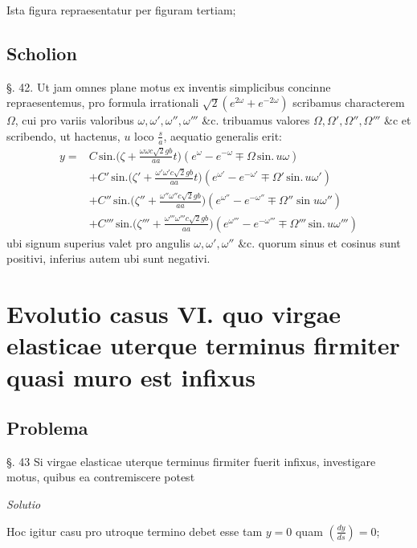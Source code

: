 \documentclass[11pt,a4paper]{article}
\begin{document}
Ista figura repraesentatur per figuram tertiam;

\subsection{Scholion}

§. 42. Ut jam omnes plane motus ex inventis simplicibus
concinne repraesentemus, pro formula irrationali $\surd 2(e^{2\omega}+e^{-2\omega})$
scribamus characterem $\Omega$, cui pro variis valoribus $\omega, \omega', \omega'', \omega'''$ \&c.
 tribuamus valores $\Omega, \Omega', \Omega'', \Omega'''$ \&c et scribendo, ut hactenus,
$u$ loco $\frac{s}{a}$, aequatio generalis erit:
\begin{align*}
y ={}& C\,\text{sin.}\Big(\zeta+\frac{\omega\omega c\surd 2gb}{aa}t\Big)(e^{\omega}-e^{-\omega}\mp\Omega\,\text{sin.}\,u\omega) \\
&+ C'\,\text{sin.}\Big(\zeta'+\frac{\omega'\omega'c\surd 2gb}{aa}t\Big)(e^{\omega'}-e^{-\omega'}\mp\Omega'\,\text{sin.}\,u\omega') \\
&+ C''\,\text{sin.}\Big(\zeta''+\frac{\omega''\omega''c\surd 2gb}{aa}\Big)(e^{\omega''}-e^{-\omega''}\mp\Omega''\sin u\omega'') \\
&+ C'''\,\text{sin.}\Big(\zeta'''+\frac{\omega'''\omega'''c\surd 2gb}{aa}\Big)(e^{\omega'''}-e^{-\omega'''}\mp\Omega'''\,\text{sin.}\,u\omega''')
\end{align*}
ubi signum superius valet pro angulis $\omega, \omega', \omega''$ \&c. quorum
sinus et cosinus sunt positivi, inferius autem ubi sunt negativi.

\section{Evolutio casus VI. quo virgae elasticae uterque terminus firmiter quasi muro est infixus}

\subsection{Problema}

§. 43 Si virgae elasticae uterque terminus firmiter fuerit
infixus, investigare motus, quibus ea contremiscere potest

\emph{Solutio}

Hoc igitur casu pro utroque termino debet esse tam $y=0$ quam $\left(\frac{dy}{ds}\right)=0$;
\end{document}
